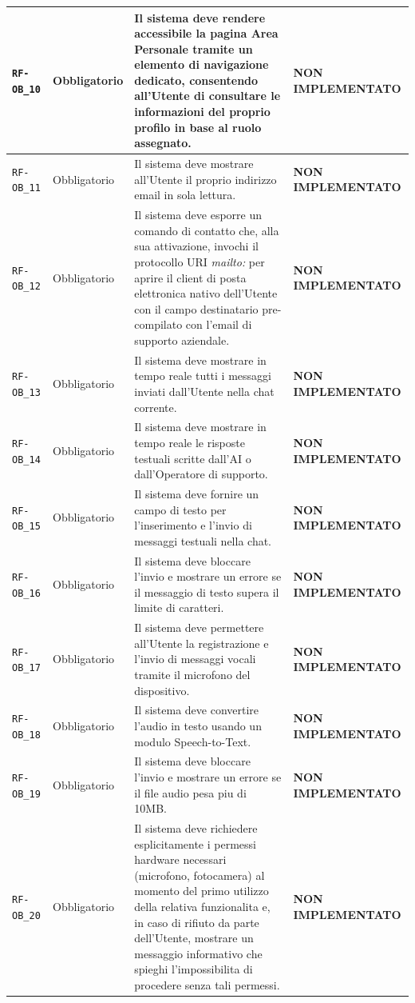 \documentclass[a4paper, 11pt, oneside]{scrartcl}
\begin{document}
\begin{longtable}{|>{\raggedright\arraybackslash}p{}|>{\raggedright\arraybackslash}p{}|>{\raggedright\arraybackslash}p{}|>{\raggedright\arraybackslash}p{}|}
    \hline
    \texttt{RF-OB\_10} & Obbligatorio & Il sistema deve rendere accessibile la pagina Area Personale tramite un elemento di navigazione dedicato, consentendo all'Utente di consultare le informazioni del proprio profilo in base al ruolo assegnato. & \textbf{NON IMPLEMENTATO} \\
    \hline
    \texttt{RF-OB\_11} & Obbligatorio & Il sistema deve mostrare all'Utente il proprio indirizzo email in sola lettura. & \textbf{NON IMPLEMENTATO} \\
    \hline
    \texttt{RF-OB\_12} & Obbligatorio & Il sistema deve esporre un comando di contatto che, alla sua attivazione, invochi il protocollo URI \textit{mailto:} per aprire il client di posta elettronica nativo dell'Utente con il campo destinatario pre-compilato con l'email di supporto aziendale. & \textbf{NON IMPLEMENTATO} \\
    \hline
    \texttt{RF-OB\_13} & Obbligatorio & Il sistema deve mostrare in tempo reale tutti i messaggi inviati dall'Utente nella chat corrente. & \textbf{NON IMPLEMENTATO} \\
    \hline
    \texttt{RF-OB\_14} & Obbligatorio & Il sistema deve mostrare in tempo reale le risposte testuali scritte dall'AI o dall'Operatore di supporto. & \textbf{NON IMPLEMENTATO} \\
    \hline
    \texttt{RF-OB\_15} & Obbligatorio & Il sistema deve fornire un campo di testo per l'inserimento e l'invio di messaggi testuali nella chat. & \textbf{NON IMPLEMENTATO} \\
    \hline
    \texttt{RF-OB\_16} & Obbligatorio & Il sistema deve bloccare l'invio e mostrare un errore se il messaggio di testo supera il limite di caratteri. & \textbf{NON IMPLEMENTATO} \\
    \hline
    \texttt{RF-OB\_17} & Obbligatorio & Il sistema deve permettere all'Utente la registrazione e l'invio di messaggi vocali tramite il microfono del dispositivo. & \textbf{NON IMPLEMENTATO} \\
    \hline
    \texttt{RF-OB\_18} & Obbligatorio & Il sistema deve convertire l'audio in testo usando un modulo Speech-to-Text. & \textbf{NON IMPLEMENTATO} \\
    \hline
    \texttt{RF-OB\_19} & Obbligatorio & Il sistema deve bloccare l'invio e mostrare un errore se il file audio pesa piu di 10MB. & \textbf{NON IMPLEMENTATO} \\
    \hline
    \texttt{RF-OB\_20} & Obbligatorio & Il sistema deve richiedere esplicitamente i permessi hardware necessari (microfono, fotocamera) al momento del primo utilizzo della relativa funzionalita e, in caso di rifiuto da parte dell'Utente, mostrare un messaggio informativo che spieghi l'impossibilita di procedere senza tali permessi. & \textbf{NON IMPLEMENTATO} \\

\end{longtable}
\end{document}
